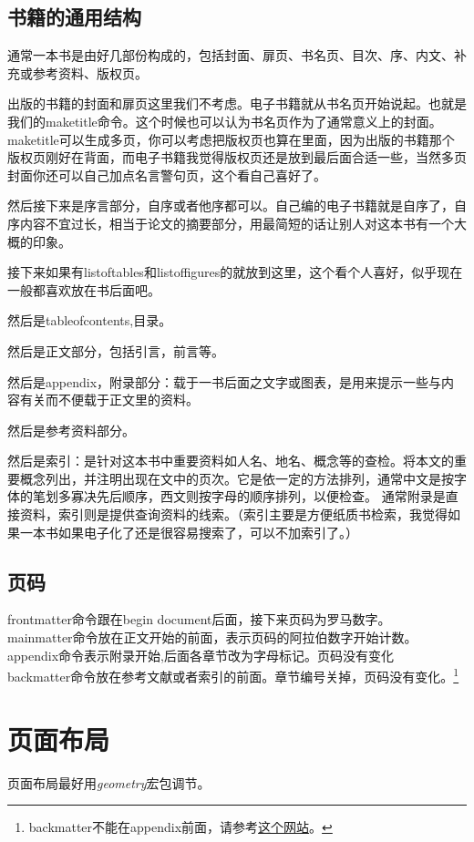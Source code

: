 \documentclass[12pt,oneside]{book}
\begin{document}
\begin{common-format}
\subsection{书籍的通用结构}
通常一本书是由好几部份构成的，包括封面、扉页、书名页、目次、序、内文、补充或参考资料、版权页。

出版的书籍的封面和扉页这里我们不考虑。电子书籍就从书名页开始说起。也就是我们的maketitle命令。这个时候也可以认为书名页作为了通常意义上的封面。maketitle可以生成多页，你可以考虑把版权页也算在里面，因为出版的书籍那个版权页刚好在背面，而电子书籍我觉得版权页还是放到最后面合适一些，当然多页封面你还可以自己加点名言警句页，这个看自己喜好了。

然后接下来是序言部分，自序或者他序都可以。自己编的电子书籍就是自序了，自序内容不宜过长，相当于论文的摘要部分，用最简短的话让别人对这本书有一个大概的印象。

接下来如果有listoftables和listoffigures的就放到这里，这个看个人喜好，似乎现在一般都喜欢放在书后面吧。

然后是tableofcontents,目录。

然后是正文部分，包括引言，前言等。

然后是appendix，附录部分：载于一书后面之文字或图表，是用来提示一些与内容有关而不便载于正文里的资料。

然后是参考资料部分。

然后是索引：是针对这本书中重要资料如人名、地名、概念等的查检。将本文的重要概念列出，并注明出现在文中的页次。它是依一定的方法排列，通常中文是按字体的笔划多寡决先后顺序，西文则按字母的顺序排列，以便检查。 通常附录是直接资料，索引则是提供查询资料的线索。（索引主要是方便纸质书检索，我觉得如果一本书如果电子化了还是很容易搜索了，可以不加索引了。）


\subsection{页码}
\label{sec:页码}
frontmatter命令跟在begin document后面，接下来页码为罗马数字。\\
mainmatter命令放在正文开始的前面，表示页码的阿拉伯数字开始计数。\\ 
appendix命令表示附录开始,后面各章节改为字母标记。页码没有变化\\
backmatter命令放在参考文献或者索引的前面。章节编号关掉，页码没有变化。\footnote{backmatter不能在appendix前面，请参考\href{http://tex.stackexchange.com/questions/20538/what-is-the-right-order-when-using-frontmatter-tableofcontents-mainmatter}{这个网站}。}


\section{页面布局}
页面布局最好用\emph{geometry}宏包调节。


\end{common-format}
\end{document}

